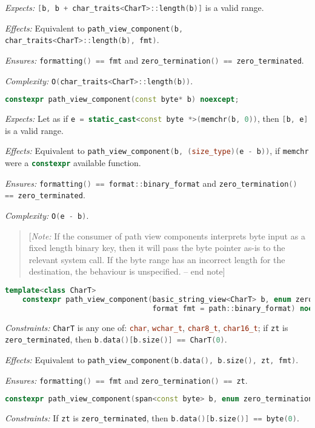 \documentclass[11pt]{article}
\newcommand{\code}[2][cpp]{\lstinline[language=#1,basicstyle=\small\ttfamily]{#2}}
\newcommand{\desc}[1]{\textit{#1}}
\newcommand{\constraints}{\desc{Constraints: }}
\newcommand{\effects}{\desc{Effects: }}
\newcommand{\expects}{\desc{Expects: }}
\newcommand{\ensures}{\desc{Ensures: }}
\newcommand{\complexity}{\desc{Complexity: }}
\newcommand{\note}[1]{\begin{quote}[\textit{Note:} #1 -- end note]\end{quote}}
\begin{document}
\expects \code{[b, b + char_traits<CharT>::length(b)]} is a valid range.

\effects Equivalent to \code{path_view_component(b, char_traits<CharT>::length(b), fmt)}.

\ensures \code{formatting() == fmt} and \code{zero_termination() == zero_terminated}.

\complexity \code{O(char_traits<CharT>::length(b))}.\\

\begin{lstlisting}[language=cpp]
    constexpr path_view_component(const byte* b) noexcept;
\end{lstlisting}

\expects Let as if \code{e = static_cast<const byte *>(memchr(b, 0))}, then \code{[b, e]} is a valid range.

\effects Equivalent to \code{path_view_component(b, (size_type)(e - b))}, if \code{memchr} were a \code{constexpr} available function.

\ensures \code{formatting() == format::binary_format} and \code{zero_termination() == zero_terminated}.

\complexity \code{O(e - b)}.\\

\color{black}

\note{If the consumer of path view components interprets byte input as a fixed length binary key, then it will pass the byte pointer as-is to the relevant system call. If the byte range has an incorrect length for the destination, the behaviour is unspecified.}

\color{darkgreen}

\begin{lstlisting}[language=cpp]
    template<class CharT>
    constexpr path_view_component(basic_string_view<CharT> b, enum zero_termination zt,
                                  format fmt = path::binary_format) noexcept;
\end{lstlisting}
\constraints \code{CharT} is any one of: \code{char}, \code{wchar_t}, \code{char8_t}, \code{char16_t}; if \code{zt} is \code{zero_terminated}, then \code{b.data()[b.size()] == CharT(0)}.

\effects Equivalent to \code{path_view_component(b.data(), b.size(), zt, fmt)}.

\ensures \code{formatting() == fmt} and \code{zero_termination() == zt}.\\

\begin{lstlisting}[language=cpp]
    constexpr path_view_component(span<const byte> b, enum zero_termination zt) noexcept;
\end{lstlisting}
\constraints If \code{zt} is \code{zero_terminated}, then \code{b.data()[b.size()] == byte(0)}.
\end{document}
